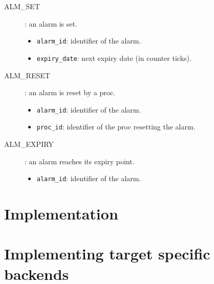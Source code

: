 \begin{description}
  \item[ALM_SET]: an alarm is set.
    \begin{itemize}
      \item \texttt{alarm_id}: identifier of the alarm.
      \item \texttt{expiry_date}: next expiry date (in counter ticks).
    \end{itemize}

  \item[ALM_RESET]: an alarm is reset by a proc.
    \begin{itemize}
      \item \texttt{alarm_id}: identifier of the alarm.
      \item \texttt{proc_id}: identifier of the proc resetting the alarm.
    \end{itemize}

  \item[ALM_EXPIRY]: an alarm reaches its expiry point.
    \begin{itemize}
      \item \texttt{alarm_id}: identifier of the alarm.
    \end{itemize}

\end{description}

\section{Implementation}

\section{Implementing target specific backends}
\label{sec:trace:targetbackend}
